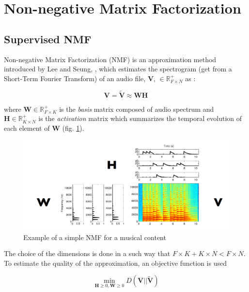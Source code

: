 \documentclass[twocolumn,a4paper,10pt]{article}
\begin{document}
\section{Non-negative Matrix Factorization}\label{part:nmf}
\subsection{Supervised NMF}
Non-negative Matrix Factorization (NMF) is an approximation method introduced by Lee and Seung, \cite{lee_learning_1999}, which estimates the spectrogram (get from a Short-Term Fourier Transform) of an audio file, $\mathbf{V}$, $\in \mathbb{R}^+_{F \times N}$ as : 

\begin{equation}\label{eq:nmf}
\mathbf{V} = \mathbf{\tilde{V}} \approx \mathbf{WH}
\end{equation}

where $\mathbf{W} \in \mathbb{R}^+_{F \times K}$ is the \textit{basis} matrix composed of audio spectrum and $\mathbf{H} \in \mathbb{R}^+_{K \times N}$ is the \textit{activation} matrix which summarizes the temporal evolution of each element of $\mathbf{W}$ (fig.  \ref{fig:example_NMF}). 

\begin{figure}[hbtp]
\centering
\includegraphics[width=0.9\linewidth]{../image/illustration_NMF.PNG}
\caption{Example of a simple NMF  for a musical content \cite{bertin_les_2009}}
\label{fig:example_NMF}
\end{figure}

The choice of the dimensions is done in a such way that $F\times K + K \times N < F \times N$. To estimate the quality of the approximation, an objective function is used 

\begin{equation}\label{eq:min-D-WH}
\underset{\mathbf{H} \geq 0, \mathbf{W} \geq 0}{\min} D\left(\mathbf{V} \vert \vert \mathbf{\tilde{V}}\right)
\end{equation}
\end{document}
